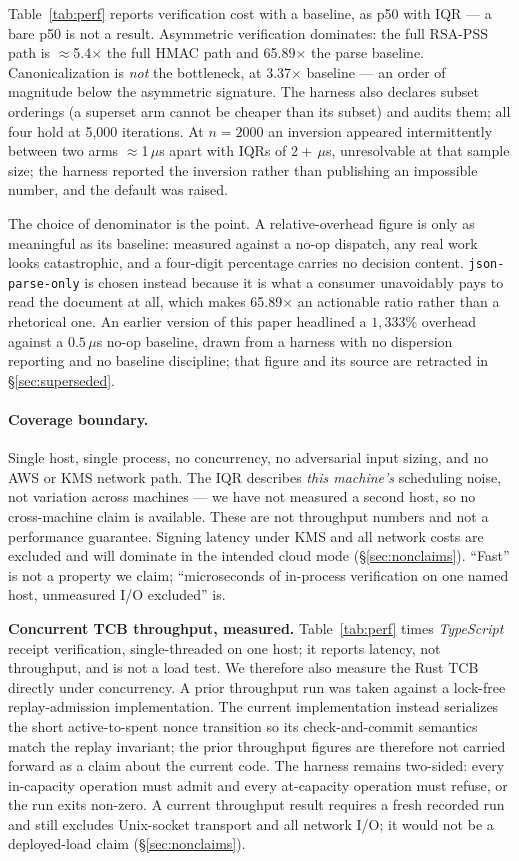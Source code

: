 \documentclass[10pt,twocolumn,letterpaper]{article}
\newcommand{\evtwoiters}{5{,}000}
\newcommand{\evtwocanonratio}{3.37}   %
\newcommand{\evtworsaratio}{65.89}    %
\begin{document}
Table~\ref{tab:perf} reports verification cost with a baseline, as p50 with
IQR --- a bare p50 is not a result. Asymmetric verification dominates: the
full RSA-PSS path is $\approx$5.4$\times$ the full HMAC path and
\evtworsaratio{}$\times$ the parse baseline. Canonicalization is
\emph{not} the bottleneck, at \evtwocanonratio{}$\times$ baseline --- an order
of magnitude below the asymmetric signature. The harness also declares subset
orderings (a superset arm cannot be cheaper than its subset) and audits them;
all four hold at \evtwoiters{} iterations. At $n=2000$ an inversion appeared
intermittently between two arms $\approx$1\,$\mu$s apart with IQRs of
$2+\,\mu$s, unresolvable at that sample size; the harness reported the
inversion rather than publishing an impossible number, and the default was
raised.

The choice of denominator is the point. A relative-overhead figure is only
as meaningful as its baseline: measured against a no-op dispatch, any real
work looks catastrophic, and a four-digit percentage carries no decision
content. \texttt{json-parse-only} is chosen instead because it is what a
consumer unavoidably pays to read the document at all, which makes
\evtworsaratio{}$\times$ an actionable ratio rather than a rhetorical one.
An earlier version of this paper headlined a $1{,}333\%$ overhead against a
$0.5\,\mu$s no-op baseline, drawn from a harness with no dispersion reporting
and no baseline discipline; that figure and its source are retracted in
\S\ref{sec:superseded}.

\paragraph{Coverage boundary.} Single host, single process, no concurrency,
no adversarial input sizing, and no AWS or KMS network path. The IQR
describes \emph{this machine's} scheduling noise, not variation across
machines --- we have not measured a second host, so no cross-machine claim is
available. These are not throughput numbers and not a performance guarantee.
Signing latency under KMS and all network costs are excluded and will
dominate in the intended cloud mode (\S\ref{sec:nonclaims}). ``Fast'' is not
a property we claim; ``microseconds of in-process verification on one named
host, unmeasured I/O excluded'' is.

\textbf{Concurrent TCB throughput, measured.} Table~\ref{tab:perf} times
\emph{TypeScript} receipt verification, single-threaded on one host; it
reports latency, not throughput, and is not a load test. We therefore also
measure the
Rust TCB directly under concurrency. A prior throughput run was taken against a
lock-free replay-admission implementation. The current implementation instead
serializes the short active-to-spent nonce transition so its check-and-commit
semantics match the replay invariant; the prior throughput figures are therefore
not carried forward as a claim about the current code. The harness remains
two-sided: every in-capacity operation must admit and every at-capacity operation
must refuse, or the run exits non-zero. A current throughput result requires a
fresh recorded run and still excludes Unix-socket transport and all network I/O;
it would not be a deployed-load claim (\S\ref{sec:nonclaims}).
\end{document}
